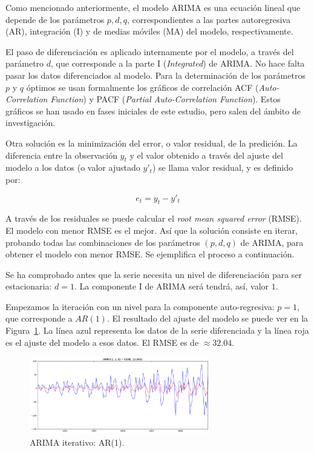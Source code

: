 \documentclass[11pt,spanish,listoffigures,listoftables]{tfgetsinf}
\begin{document}
    Como mencionado anteriormente, el modelo ARIMA es una ecuación lineal que depende de los parámetros \(p, d, q\), correspondientes a las partes autoregresiva (AR), integración (I) y de medias móviles (MA) del modelo, respectivamente. 
    
    El paso de diferenciación es aplicado internamente por el modelo, a través del parámetro \(d\), que corresponde a la parte I ({\em Integrated}) de ARIMA. No hace falta pasar los datos diferenciados al modelo. Para la determinación de los parámetros \(p\) y \(q\) óptimos se usan formalmente los gráficos de correlación ACF ({\em Auto-Correlation Function}) y PACF ({\em Partial Auto-Correlation Function}). Estos gráficos se han usado en fases iniciales de este estudio, pero salen del ámbito de investigación. 
    
    Otra solución es la minimización del error, o valor residual, de la predición. La diferencia entre la observación \(y_{t}\) y el valor obtenido a través del ajuste del modelo a los datos (o valor ajustado \(y'_{t}\)) se llama valor residual, y es definido por:
    
    \begin{equation}
    e_{t} = y_{t} - y'_{t}
    \end{equation}
    
    A través de los residuales se puede calcular el {\em root mean squared error} (RMSE). El modelo con menor RMSE es el mejor. Así que la solución consiste en iterar, probando todas las combinaciones de los parámetros \((p,d,q)\) de ARIMA, para obtener el modelo con menor RMSE. Se ejemplifica el proceso a continuación.
    
    Se ha comprobado antes que la serie necesita un nivel de diferenciación para ser estacionaria: \(d=1\). La componente I de ARIMA será tendrá, así, valor \(1\). 
    
    Empezamos la iteración con un nivel para la componente auto-regresiva: \(p=1\), que corresponde a \(AR(1)\). El resultado del ajuste del modelo se puede ver en la Figura~\ref{fig:iterative_arima_ar_1}. La línea azul representa los datos de la serie diferenciada y la línea roja es el ajuste del modelo a esos datos. El RMSE es de \(\approx32.04\). 
    
    \begin{figure}[h]
        \centering
        \includegraphics[width=0.7\textwidth]{arima_110.png}
        \caption{ARIMA iterativo: AR(1).}
        \label{fig:iterative_arima_ar_1}
    \end{figure}
    
\end{document}
